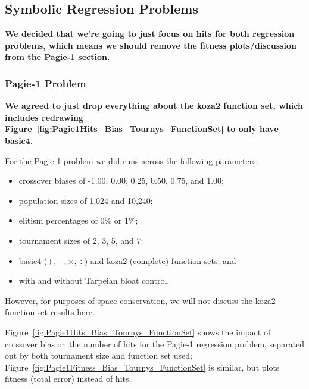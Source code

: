\documentclass{sig-alternate}
\begin{document}

\subsection{Symbolic Regression Problems}

\textbf{We decided that we're going to just focus on hits for both regression problems, which means we should remove the fitness plots/discussion from the Pagie-1 section.}

\subsubsection{Pagie-1 Problem}

\textbf{We agreed to just drop everything about the koza2 function set, which includes redrawing Figure~\ref{fig:Pagie1Hits_Bias_Tournys_FunctionSet} to only have basic4.}

For the Pagie-1 problem we did runs across the following parameters:

\begin{itemize}
	\item crossover biases of -1.00, 0.00, 0.25, 0.50, 0.75, and 1.00;
	\item population sizes of 1,024 and 10,240;
	\item elitism percentages of 0\% or 1\%;
	\item tournament sizes of 2, 3, 5, and 7;
	\item basic4 ($+, -, \times, \div$) and koza2 (complete) function sets; and
	\item with and without Tarpeian bloat control.
\end{itemize}

However, for purposes of space conservation, we will not discuss the koza2 function set results here.

Figure~\ref{fig:Pagie1Hits_Bias_Tournys_FunctionSet} shows the impact of crossover bias on the number of hits for the
Pagie-1 regression problem, separated out by both tournament size and function set used;
Figure~\ref{fig:Pagie1Fitness_Bias_Tournys_FunctionSet} is similar, but plots fitness (total error) instead of hits.
\end{document}

